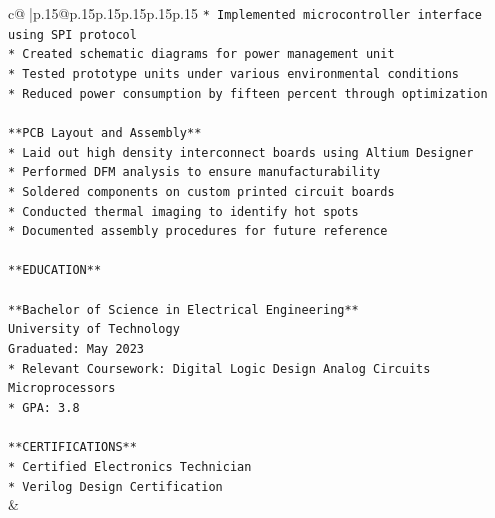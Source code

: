 \documentclass{article}
\begin{document}
{\begin{supertabular}{c@{$\;$}|p{.15\linewidth}@{}p{.15\linewidth}p{.15\linewidth}p{.15\linewidth}p{.15\linewidth}p{.15\linewidth}}
{{{\texttt{*   Implemented microcontroller interface using SPI protocol} \\
\texttt{*   Created schematic diagrams for power management unit} \\
\texttt{*   Tested prototype units under various environmental conditions} \\
\texttt{*   Reduced power consumption by fifteen percent through optimization} \\
\\ 
\texttt{**PCB Layout and Assembly**} \\
\texttt{*   Laid out high density interconnect boards using Altium Designer} \\
\texttt{*   Performed DFM analysis to ensure manufacturability} \\
\texttt{*   Soldered components on custom printed circuit boards} \\
\texttt{*   Conducted thermal imaging to identify hot spots} \\
\texttt{*   Documented assembly procedures for future reference} \\
\\ 
\texttt{**EDUCATION**} \\
\\ 
\texttt{**Bachelor of Science in Electrical Engineering**} \\
\texttt{University of Technology} \\
\texttt{Graduated: May 2023} \\
\texttt{*   Relevant Coursework: Digital Logic Design Analog Circuits Microprocessors} \\
\texttt{*   GPA: 3.8} \\
\\ 
\texttt{**CERTIFICATIONS**} \\
\texttt{*   Certified Electronics Technician} \\
\texttt{*   Verilog Design Certification} \\
            }
        }
    }
    & \\ \\


\end{supertabular}}
\end{document}
